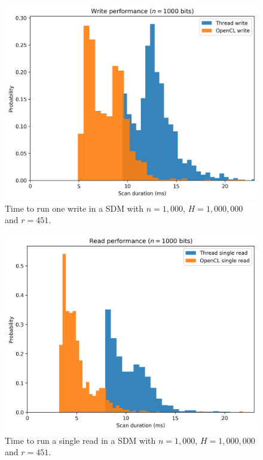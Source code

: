 \begin{figure}[!htb]
\centering\includegraphics[width=\textwidth]{images02/performance/imac-write-1000.png}
\caption{Time to run one write in a SDM with $n=1,000$, $H=1,000,000$ and $r=451$.
\label{fig:perf-imac-write-1000}}
\end{figure}

\begin{figure}[!htb]
\centering\includegraphics[width=\textwidth]{images02/performance/imac-read-1000.png}
\caption{Time to run a single read in a SDM with $n=1,000$, $H=1,000,000$ and $r=451$.
\label{fig:perf-imac-read-1000}}
\end{figure}


